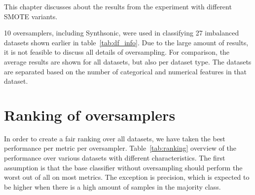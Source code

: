 
This chapter discusses about the results from the experiment with different SMOTE variants. 

10 oversamplers, including Synthsonic, were used in classifying 27 imbalanced datasets shown earlier in table~\ref{tab:df_info}. Due to the large amount of results, it is not feasible to discuss all details of oversampling. For comparison, the average results are shown for all datasets, but also per dataset type. The datasets are separated based on the number of categorical and numerical features in that dataset.

\section{Ranking of oversamplers}
In order to create a fair ranking over all datasets, we have taken the best performance per metric per oversampler. Table~\ref{tab:ranking} overview of the performance over various datasets with different characteristics. The first assumption is that the base classifier without oversampling should perform the worst out of all on most metrics. The exception is precision, which is expected to be higher when there is a high amount of samples in the majority class. 

